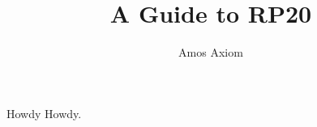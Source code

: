\documentclass[letter, 10pt, titlepage]{book}
\title{A Guide to RP20}
\author{Amos Axiom}
\begin{document}
	\maketitle
	
	\tableofcontents
	\newpage
	
	Howdy Howdy.
\end{document}

